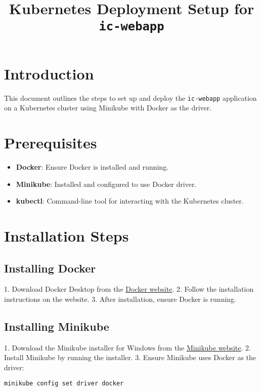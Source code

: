 \documentclass{article}
\begin{document}
\title{Kubernetes Deployment Setup for \texttt{ic-webapp}}
\author{}
\date{}
\maketitle

\section*{Introduction}
This document outlines the steps to set up and deploy the \texttt{ic-webapp} application on a Kubernetes cluster using Minikube with Docker as the driver.

\section*{Prerequisites}
\begin{itemize}
    \item \textbf{Docker}: Ensure Docker is installed and running.
    \item \textbf{Minikube}: Installed and configured to use Docker driver.
    \item \textbf{kubectl}: Command-line tool for interacting with the Kubernetes cluster.
\end{itemize}

\section*{Installation Steps}

\subsection*{Installing Docker}
1. Download Docker Desktop from the \href{https://www.docker.com/products/docker-desktop}{Docker website}.
2. Follow the installation instructions on the website.
3. After installation, ensure Docker is running.

\subsection*{Installing Minikube}
1. Download the Minikube installer for Windows from the \href{https://minikube.sigs.k8s.io/docs/start/}{Minikube website}.
2. Install Minikube by running the installer.
3. Ensure Minikube uses Docker as the driver:
   \begin{lstlisting}[language=bash]
   minikube config set driver docker
   \end{lstlisting}
\end{document}
